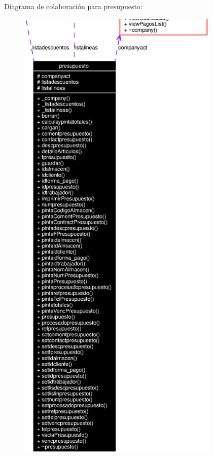Diagrama de colaboraci\'{o}n para presupuesto:\begin{figure}[H]
\begin{center}
\leavevmode
\includegraphics[width=273pt]{classpresupuesto__coll__graph}
\end{center}
\end{figure}

